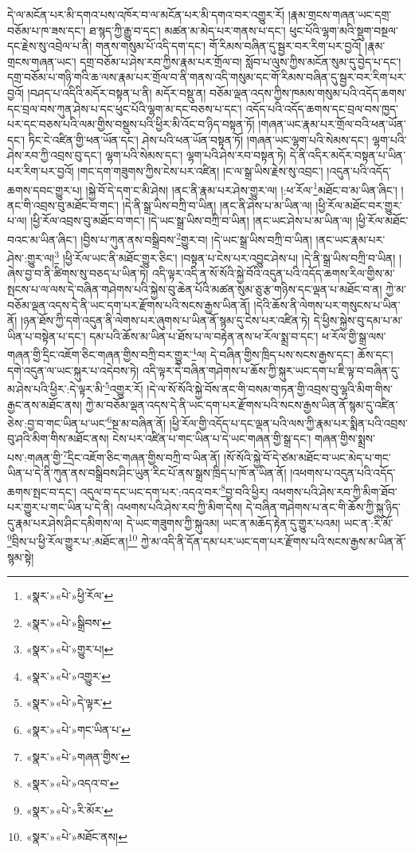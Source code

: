 དེ་ལ་མངོན་པར་མི་དགའ་པས་འཁོར་བ་ལ་མངོན་པར་མི་དགའ་བར་འགྱུར་རོ། །རྣམ་གྲངས་གཞན་ཡང་དགྲ་བཅོམ་པ་ཁ་ཟས་དང་། ཐ་སྙད་ཀྱི་རྒྱུ་བ་དང་། མཚན་མ་མེད་པར་གནས་པ་དང་། ཕུང་པོའི་ལྷག་མའི་སྡུག་བསྔལ་དང་རྗེས་སུ་འབྲེལ་པ་ནི། གནས་གསུམ་པོ་འདི་དག་དང་། གོ་རིམས་བཞིན་དུ་སྦྱར་བར་རིག་པར་བྱའོ། །རྣམ་གྲངས་གཞན་ཡང་། དགྲ་བཅོམ་པ་ཤེས་རབ་ཀྱིས་རྣམ་པར་གྲོལ་བ། སློབ་པ་ལུས་ཀྱིས་མངོན་སུམ་དུ་བྱེད་པ་དང་། དགྲ་བཅོམ་པ་གཉི་གའི་ཆ་ལས་རྣམ་པར་གྲོལ་བ་ནི་གནས་འདི་གསུམ་དང་གོ་རིམས་བཞིན་དུ་སྦྱར་བར་རིག་པར་བྱའོ། །བཤད་པ་འདིའི་མདོར་བསྟན་པ་ནི། མདོར་བསྡུ་ན། བཅོམ་ལྡན་འདས་ཀྱིས་ཁམས་གསུམ་པའི་འདོད་ཆགས་དང་བྲལ་བས་ཀུན་ཤེས་པ་དང་ཕུང་པོའི་ལྷག་མ་དང་བཅས་པ་དང་། འདོད་པའི་འདོད་ཆགས་དང་བྲལ་བས་ཁྱད་པར་དང་བཅས་པའི་ལམ་གྱིས་བསྡུས་པའི་ཕྱིར་མི་འོང་བ་ཉིད་བསྟན་ཏོ། །གཞན་ཡང་རྣམ་པར་གྲོལ་བའི་ཕན་ཡོན་དང་། ཏིང་ངེ་འཛིན་གྱི་ཕན་ཡོན་དང་། ཤེས་པའི་ཕན་ཡོན་བསྟན་ཏོ། །གཞན་ཡང་ལྷག་པའི་སེམས་དང་། ལྷག་པའི་ཤེས་རབ་ཀྱི་འབྲས་བུ་དང་། ལྷག་པའི་སེམས་དང་། ལྷག་པའི་ཤེས་རབ་བསྟན་ཏེ། དེ་ནི་འདིར་མདོར་བསྟན་པ་ཡིན་པར་རིག་པར་བྱའོ། །གང་དག་གཟུགས་ཀྱིས་ངེས་པར་འཛིན། །ང་ལ་སྒྲ་ཡིས་རྗེས་སུ་འབྲང་། །འདུན་པའི་འདོད་ཆགས་དབང་གྱུར་པ། །སྐྱེ་བོ་དེ་དག་ང་མི་ཤེས། །ནང་ནི་རྣམ་པར་ཤེས་གྱུར་ལ། །:ཕ་རོལ་\footnote{«སྣར་»«པེ་»ཕྱི་རོལ་}མཐོང་བ་མ་ཡིན་ཞིང་། །ནང་གི་འབྲས་བུ་མཐོང་བ་གང་། །དེ་ནི་སྒྲ་ཡིས་བཀྲི་བ་ཡིན། །ནང་ནི་ཤེས་པ་མ་ཡིན་ལ། །ཕྱི་རོལ་མཐོང་བར་གྱུར་པ་ལ། །ཕྱི་རོལ་འབྲས་བུ་མཐོང་བ་གང་། །དེ་ཡང་སྒྲ་ཡིས་བཀྲི་བ་ཡིན། །ནང་ཡང་ཤེས་པ་མ་ཡིན་ལ། །ཕྱི་རོལ་མཐོང་བའང་མ་ཡིན་ཞིང་། །བྱིས་པ་ཀུན་ནས་བསྒྲིབས་\footnote{«སྣར་»«པེ་»སྒྲིབས་}གྱུར་བ། །དེ་ཡང་སྒྲ་ཡིས་བཀྲི་བ་ཡིན། །ནང་ཡང་རྣམ་པར་ཤེས་:གྱུར་ལ།\footnote{«སྣར་»«པེ་»གྱུར་པ།} །ཕྱི་རོལ་ཡང་ནི་མཐོང་གྱུར་ཅིང་། །བསྟན་པ་ངེས་པར་འབྱུང་ཤེས་པ། །དེ་ནི་སྒྲ་ཡིས་བཀྲི་བ་ཡིན། །ཞེས་བྱ་བ་ནི་ཚིགས་སུ་བཅད་པ་ཡིན་ཏེ། འདི་ལྟར་འདི་ན་སོ་སོའི་སྐྱེ་བོའི་འདུན་པའི་འདོད་ཆགས་རིལ་གྱིས་མ་སྤངས་པ་ལ་ལས་དེ་བཞིན་གཤེགས་པའི་སྐྱེས་བུ་ཆེན་པོའི་མཚན་སུམ་ཅུ་རྩ་གཉིས་དང་ལྡན་པ་མཐོང་བ་ན། ཀྱེ་མ་བཅོམ་ལྡན་འདས་དེ་ནི་ཡང་དག་པར་རྫོགས་པའི་སངས་རྒྱས་ཡིན་ནོ། །དེའི་ཆོས་ནི་ལེགས་པར་གསུངས་པ་ཡིན་ནོ། །ཉན་ཐོས་ཀྱི་དགེ་འདུན་ནི་ལེགས་པར་ཞུགས་པ་ཡིན་ནོ་སྙམ་དུ་ངེས་པར་འཛིན་ཏེ། དེ་ཕྱིས་སྐྱེས་བུ་དམ་པ་མ་ཡིན་པ་བསྟེན་པ་དང་། དམ་པའི་ཆོས་མ་ཡིན་པ་ཐོས་པ་ལ་བརྟེན་ནས་ཕ་རོལ་སྨྲ་བ་དང་། ཕ་རོལ་གྱི་སྒྲ་ལས་གཞན་གྱི་དྲིང་འཇོག་ཅིང་གཞན་གྱིས་བཀྲི་བར་གྱུར་\footnote{«སྣར་»«པེ་»འགྱུར་}ལ། དེ་བཞིན་གྱིས་ཁྲིད་པས་སངས་རྒྱས་དང་། ཆོས་དང་། དགེ་འདུན་ལ་ཡང་སྐུར་པ་འདེབས་ཏེ། འདི་ལྟར་དེ་བཞིན་གཤེགས་པ་ཆོས་ཀྱི་སྐུར་ཡང་དག་པ་ཇི་ལྟ་བ་བཞིན་དུ་མ་ཤེས་པའི་ཕྱིར་:དེ་ལྟར་མི་\footnote{«སྣར་»«པེ་»དེ་ལྟར་}འགྱུར་རོ། །དེ་ལ་སོ་སོའི་སྐྱེ་བོས་ནང་གི་བསམ་གཏན་གྱི་འབྲས་བུ་ལྷའི་མིག་གིས་རྒྱང་ནས་མཐོང་ནས། ཀྱེ་མ་བཅོམ་ལྡན་འདས་དེ་ནི་ཡང་དག་པར་རྫོགས་པའི་སངས་རྒྱས་ཡིན་ནོ་སྙམ་དུ་འཛིན་ཅེས་:བྱ་བ་གང་ཡིན་པ་ཡང་\footnote{«སྣར་»«པེ་»གང་ཡིན་པ་}སྔ་མ་བཞིན་ནོ། །ཕྱི་རོལ་གྱི་འདོད་པ་དང་ལྡན་པའི་ལས་ཀྱི་རྣམ་པར་སྨིན་པའི་འབྲས་བུ་ཤའི་མིག་གིས་མཐོང་ནས། ངེས་པར་འཛིན་པ་གང་ཡིན་པ་དེ་ཡང་གཞན་གྱི་སྒྲ་དང་། གཞན་གྱིས་སྨྲས་པས་:གཞན་གྱི་\footnote{«སྣར་»«པེ་»གཞན་གྱིས་}དྲིང་འཇོག་ཅིང་གཞན་གྱིས་བཀྲི་བ་ཡིན་ནོ། །སོ་སོའི་སྐྱེ་བོ་དེ་ཙམ་མཐོང་བ་ཡང་མེད་པ་གང་ཡིན་པ་དེ་ནི་ཀུན་ནས་བསྒྲིབས་ཤིང་ཡུན་རིང་པོ་ནས་སྒྲས་ཁྲིད་པ་ཁོ་ན་ཡིན་ནོ། །འཕགས་པ་འདུན་པའི་འདོད་ཆགས་སྤང་བ་དང་། འདུལ་བ་དང་ཡང་དག་པར་:འདའ་བར་\footnote{«སྣར་»«པེ་»འདའ་བ་}བྱ་བའི་ཕྱིར། འཕགས་པའི་ཤེས་རབ་ཀྱི་མིག་ཐོབ་པར་གྱུར་པ་གང་ཡིན་པ་དེ་ནི། འཕགས་པའི་ཤེས་རབ་ཀྱི་མིག་དེས། དེ་བཞིན་གཤེགས་པ་ནང་གི་ཆོས་ཀྱི་སྐུ་ཉིད་དུ་རྣམ་པར་ཤེས་ཤིང་དམིགས་ལ། དེ་ཡང་གཟུགས་ཀྱི་སྐུའམ། ཡང་ན་མཆོད་རྟེན་དུ་གྱུར་པའམ། ཡང་ན་:རི་མོ་\footnote{«སྣར་»«པེ་»རི་མོར་}བྲིས་པ་ཕྱི་རོལ་གྱུར་པ་:མཐོང་ན།\footnote{«སྣར་»«པེ་»མཐོང་ནས།} ཀྱེ་མ་འདི་ནི་དོན་དམ་པར་ཡང་དག་པར་རྫོགས་པའི་སངས་རྒྱས་མ་ཡིན་ནོ་སྙམ་སྟེ། 